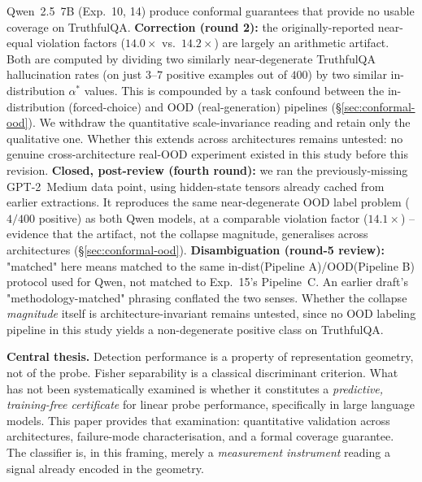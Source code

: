 \documentclass[onecolumn]{jmlr}
\begin{document}
\begin{enumerate}[leftmargin=*, topsep=2pt, itemsep=1pt]
    Qwen~2.5~7B (Exp.~10, 14) produce conformal guarantees that provide
    no usable coverage on TruthfulQA. \textbf{Correction (round 2):} the
    originally-reported near-equal violation factors ($14.0\times$ vs.\
    $14.2\times$) are largely an arithmetic artifact. Both are computed
    by dividing two similarly near-degenerate TruthfulQA hallucination
    rates (on just $3$--$7$ positive examples out of $400$) by two
    similar in-distribution $\alpha^*$ values. This is compounded by a
    task confound between the in-distribution (forced-choice) and OOD
    (real-generation) pipelines (\S\ref{sec:conformal-ood}). We withdraw
    the quantitative scale-invariance reading and retain only the
    qualitative one. Whether this extends across architectures remains
    untested: no genuine cross-architecture real-OOD experiment existed
    in this study before this revision. \textbf{Closed, post-review
    (fourth round):} we ran the previously-missing GPT-2~Medium data
    point, using hidden-state tensors already cached from earlier
    extractions. It reproduces the same near-degenerate OOD label
    problem ($4/400$ positive) as both Qwen models, at a comparable
    violation factor ($14.1\times$) -- evidence that the artifact, not
    the collapse magnitude, generalises across architectures
    (\S\ref{sec:conformal-ood}). \textbf{Disambiguation (round-5
    review):} "matched" here means matched to the same in-dist(Pipeline
    A)/OOD(Pipeline B) protocol used for Qwen, not matched to Exp.~15's
    Pipeline~C. An earlier draft's "methodology-matched" phrasing
    conflated the two senses. Whether the collapse \emph{magnitude}
    itself is architecture-invariant remains untested, since no OOD
    labeling pipeline in this study yields a non-degenerate positive
    class on TruthfulQA.
\end{enumerate}

\medskip
\noindent\textbf{Central thesis.}
Detection performance is a property of representation geometry, not of
the probe. Fisher separability is a classical discriminant criterion.
What has not been systematically examined is whether it constitutes a
\emph{predictive, training-free certificate} for linear probe
performance, specifically in large language models. This paper provides
that examination: quantitative validation across architectures,
failure-mode characterisation, and a formal coverage guarantee. The
classifier is, in this framing, merely a \emph{measurement instrument}
reading a signal already encoded in the geometry.
\end{document}
